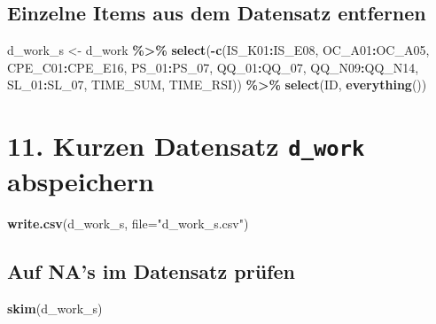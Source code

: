 \documentclass[
]{article}
\newenvironment{Shaded}{\begin{snugshade}}{\end{snugshade}}
\newcommand{\AttributeTok}[1]{\textcolor[rgb]{0.13,0.29,0.53}{#1}}
\newcommand{\FunctionTok}[1]{\textcolor[rgb]{0.13,0.29,0.53}{\textbf{#1}}}
\newcommand{\NormalTok}[1]{#1}
\newcommand{\OtherTok}[1]{\textcolor[rgb]{0.56,0.35,0.01}{#1}}
\newcommand{\SpecialCharTok}[1]{\textcolor[rgb]{0.81,0.36,0.00}{\textbf{#1}}}
\newcommand{\StringTok}[1]{\textcolor[rgb]{0.31,0.60,0.02}{#1}}
\begin{document}
\subsection{Einzelne Items aus dem Datensatz
entfernen}\label{einzelne-items-aus-dem-datensatz-entfernen}

\begin{Shaded}
\begin{Highlighting}[]
\NormalTok{d\_work\_s }\OtherTok{\textless{}{-}}\NormalTok{ d\_work }\SpecialCharTok{\%\textgreater{}\%} 
  \FunctionTok{select}\NormalTok{(}\SpecialCharTok{{-}}\FunctionTok{c}\NormalTok{(IS\_K01}\SpecialCharTok{:}\NormalTok{IS\_E08, OC\_A01}\SpecialCharTok{:}\NormalTok{OC\_A05, CPE\_C01}\SpecialCharTok{:}\NormalTok{CPE\_E16, PS\_01}\SpecialCharTok{:}\NormalTok{PS\_07, QQ\_01}\SpecialCharTok{:}\NormalTok{QQ\_07, QQ\_N09}\SpecialCharTok{:}\NormalTok{QQ\_N14, SL\_01}\SpecialCharTok{:}\NormalTok{SL\_07, TIME\_SUM, TIME\_RSI)) }\SpecialCharTok{\%\textgreater{}\%} 
  \FunctionTok{select}\NormalTok{(ID, }\FunctionTok{everything}\NormalTok{())}
\end{Highlighting}
\end{Shaded}

\section{\texorpdfstring{11. Kurzen Datensatz \texttt{d\_work}
abspeichern}{11. Kurzen Datensatz d\_work abspeichern}}\label{kurzen-datensatz-d_work-abspeichern}

\begin{Shaded}
\begin{Highlighting}[]
\FunctionTok{write.csv}\NormalTok{(d\_work\_s, }\AttributeTok{file=}\StringTok{"d\_work\_s.csv"}\NormalTok{)}
\end{Highlighting}
\end{Shaded}

\subsection{Auf NA's im Datensatz
prüfen}\label{auf-nas-im-datensatz-pruxfcfen}

\begin{Shaded}
\begin{Highlighting}[]
\FunctionTok{skim}\NormalTok{(d\_work\_s)}
\end{Highlighting}
\end{Shaded}
\end{document}
